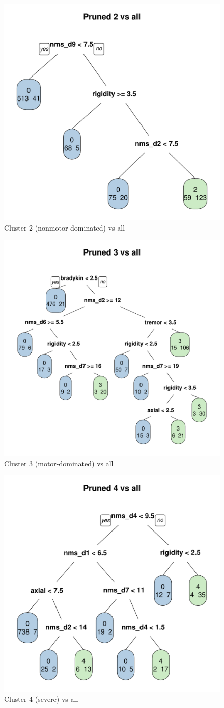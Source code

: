 \documentclass[10pt]{article}
\begin{document}
\begin{figure}[h]
  \centering
  \includegraphics[width=0.6\linewidth]{dtree-2va-pruned.pdf}
  \caption{Cluster 2 (nonmotor-dominated) vs all}
  \label{fig:2va}
\end{figure}
\begin{figure}[h]
  \centering
  \includegraphics[width=0.6\linewidth]{dtree-3va-pruned.pdf}
  \caption{Cluster 3 (motor-dominated) vs all}
  \label{fig:3va}
\end{figure}
\begin{figure}[h]
  \centering
  \includegraphics[width=0.6\linewidth]{dtree-4va-pruned.pdf}
  \caption{Cluster 4 (severe) vs all}
  \label{fig:4va}
\end{figure}
\end{document}
